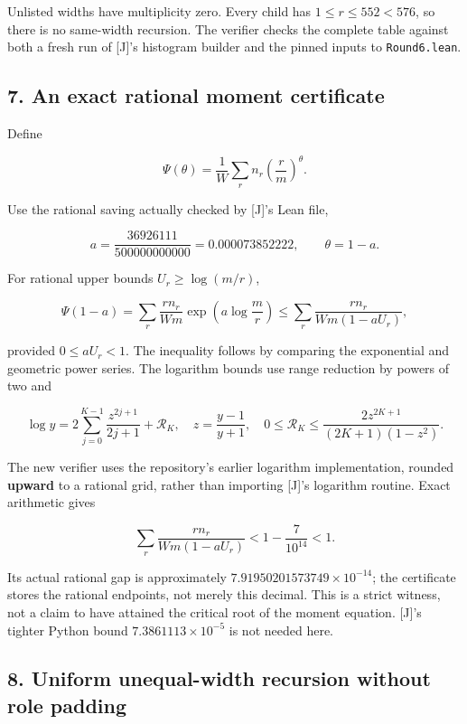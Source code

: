 \documentclass[
  11pt,
]{article}
\begin{document}
Unlisted widths have multiplicity zero. Every child has
\(1\le r\le552<576\), so there is no same-width recursion. The verifier
checks the complete table against both a fresh run of {[}J{]}'s
histogram builder and the pinned inputs to \texttt{Round6.lean}.

\subsection{7. An exact rational moment
certificate}\label{an-exact-rational-moment-certificate}

Define

\[
 \Psi(\theta)=\frac1W\sum_r n_r\left(\frac rm\right)^\theta.
\]

Use the rational saving actually checked by {[}J{]}'s Lean file,

\[
 a=\frac{36926111}{500000000000}=0.000073852222,
 \qquad \theta=1-a.
\]

For rational upper bounds \(U_r\ge\log(m/r)\),

\[
 \Psi(1-a)
 =\sum_r\frac{rn_r}{Wm}\exp\!\left(a\log\frac mr\right)
 \le\sum_r\frac{rn_r}{Wm(1-aU_r)},
 \tag{7.1}
\]

provided \(0\le aU_r<1\). The inequality follows by comparing the
exponential and geometric power series. The logarithm bounds use range
reduction by powers of two and

\[
 \log y=2\sum_{j=0}^{K-1}\frac{z^{2j+1}}{2j+1}+\mathcal R_K,
 \quad z=\frac{y-1}{y+1},\quad
 0\le\mathcal R_K\le\frac{2z^{2K+1}}{(2K+1)(1-z^2)}.
\]

The new verifier uses the repository's earlier logarithm implementation,
rounded \textbf{upward} to a rational grid, rather than importing
{[}J{]}'s logarithm routine. Exact arithmetic gives

\[
 \sum_r\frac{rn_r}{Wm(1-aU_r)}
 <1-\frac7{10^{14}}<1.
 \tag{7.2}
\]

Its actual rational gap is approximately
\(7.91950201573749\times10^{-14}\); the certificate stores the rational
endpoints, not merely this decimal. This is a strict witness, not a
claim to have attained the critical root of the moment equation.
{[}J{]}'s tighter Python bound \(7.3861113\times10^{-5}\) is not needed
here.

\subsection{8. Uniform unequal-width recursion without role
padding}\label{uniform-unequal-width-recursion-without-role-padding}
\end{document}
